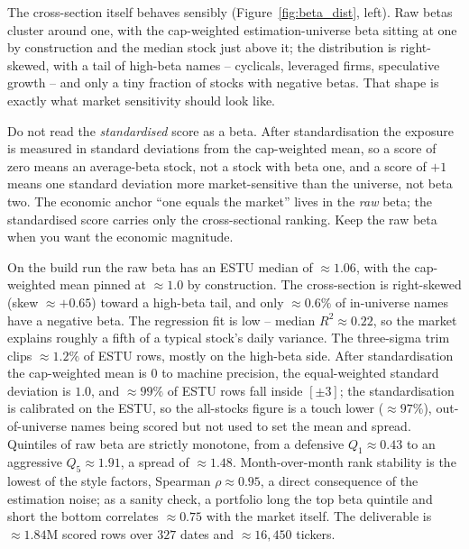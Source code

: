\documentclass[11pt]{article}
\theoremstyle{definition}
\theoremstyle{plain}
\theoremstyle{remark}
\begin{document}
The cross-section itself behaves sensibly (Figure~\ref{fig:beta_dist}, left). Raw betas cluster around one, with the cap-weighted estimation-universe beta sitting at one by construction and the median stock just above it; the distribution is right-skewed, with a tail of high-beta names -- cyclicals, leveraged firms, speculative growth -- and only a tiny fraction of stocks with negative betas. That shape is exactly what market sensitivity should look like.

\begin{pitfall}
Do not read the \emph{standardised} score as a beta. After standardisation the exposure is measured in standard deviations from the cap-weighted mean, so a score of zero means an average-beta stock, not a stock with beta one, and a score of $+1$ means one standard deviation more market-sensitive than the universe, not beta two. The economic anchor ``one equals the market'' lives in the \emph{raw} beta; the standardised score carries only the cross-sectional ranking. Keep the raw beta when you want the economic magnitude.
\end{pitfall}

\begin{observed}
On the build run the raw beta has an ESTU median of $\approx 1.06$, with the cap-weighted mean pinned at $\approx 1.0$ by construction. The cross-section is right-skewed (skew $\approx +0.65$) toward a high-beta tail, and only $\approx 0.6\%$ of in-universe names have a negative beta. The regression fit is low -- median $R^2 \approx 0.22$, so the market explains roughly a fifth of a typical stock's daily variance. The three-sigma trim clips $\approx 1.2\%$ of ESTU rows, mostly on the high-beta side. After standardisation the cap-weighted mean is $0$ to machine precision, the equal-weighted standard deviation is $1.0$, and $\approx 99\%$ of ESTU rows fall inside $[\pm 3]$; the standardisation is calibrated on the ESTU, so the all-stocks figure is a touch lower ($\approx 97\%$), out-of-universe names being scored but not used to set the mean and spread. Quintiles of raw beta are strictly monotone, from a defensive $Q_1 \approx 0.43$ to an aggressive $Q_5 \approx 1.91$, a spread of $\approx 1.48$. Month-over-month rank stability is the lowest of the style factors, Spearman $\rho \approx 0.95$, a direct consequence of the estimation noise; as a sanity check, a portfolio long the top beta quintile and short the bottom correlates $\approx 0.75$ with the market itself. The deliverable is $\approx 1.84$M scored rows over $327$ dates and $\approx 16{,}450$ tickers.
\end{observed}
\end{document}
